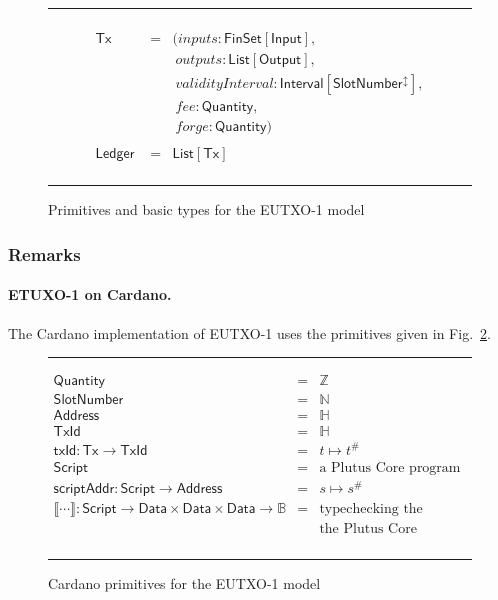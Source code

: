 \documentclass[a4paper]{article}
\renewcommand{\i}{\textit}  %
\newcommand{\s}{\textsf}  %
\newcommand{\msf}[1]{\ensuremath{\mathsf{#1}}}
\newcommand{\mi}[1]{\ensuremath{\mathit{#1}}}
\newcommand\rfskip{7pt}
\newenvironment{ruledfigure}[1]{\begin{figure}[#1]\hrule\vspace{\rfskip}}{\vspace{\rfskip}\hrule\end{figure}}
\newcommand{\hash}[1]{\ensuremath{#1^{\#}}}
\newcommand{\List}[1]{\ensuremath{\s{List}[#1]}}
\newcommand{\FinSet}[1]{\ensuremath{\s{FinSet}[#1]}}
\newcommand{\Interval}[1]{\ensuremath{\s{Interval}[#1]}}
\newcommand{\extended}[1]{#1^\updownarrow}
\newcommand{\script}{\ensuremath{\s{Script}}}
\newcommand{\scriptAddr}{\msf{scriptAddr}}
\newcommand{\TxId}{\ensuremath{\s{TxId}}}
\newcommand{\txId}{\msf{txId}}
\newcommand{\Address}{\ensuremath{\s{Address}}}
\newcommand{\inputs}{\mi{inputs}}
\newcommand{\outputs}{\mi{outputs}}
\newcommand{\forge}{\mi{forge}}
\newcommand{\fee}{\mi{fee}}
\newcommand{\Data}{\ensuremath{\s{Data}}}
\newcommand{\slotnum}{\ensuremath{\s{SlotNumber}}}
\newcommand{\eutxotx}{\msf{Tx}}
\newcommand{\qty}{\ensuremath{\s{Quantity}}}
\newcommand\B{\ensuremath{\mathbb{B}}}
\newcommand\N{\ensuremath{\mathbb{N}}}
\newcommand\Z{\ensuremath{\mathbb{Z}}}
\renewcommand\H{\ensuremath{\mathbb{H}}}
\begin{document}
\begin{ruledfigure}{H}
\begin{displaymath}
\begin{array}{rll}
     \\
     \eutxotx\s{ } &=&(\inputs: \FinSet{\s{Input}},\\
                   & &\ \outputs: \List{\s{Output}},\\
                   & &\ \i{validityInterval}: \Interval{\extended{\slotnum}},\\
                   & &\ \fee: \qty,\\
                   & &\ \forge: \qty) \\
     \\
     \s{Ledger } &=&\!\List{\eutxotx}\\
  \end{array}
  \end{displaymath}
  \caption{Primitives and basic types for the EUTXO-1 model}
  \label{fig:eutxo-1-types}
\end{ruledfigure}

\subsubsection{Remarks}
\paragraph{ETUXO-1 on Cardano.}
The Cardano implementation of EUTXO-1 uses the primitives given in
Fig.~\ref{fig:eutxo-1-types-cardano}.

\begin{ruledfigure}{H}
  \begin{displaymath}
  \begin{array}{rll}
    \qty{} &=& \Z\\
    \slotnum &=& \N\\
    \Address &=& \H\\
    \TxId &=& \H\\
    \txId : \eutxotx \rightarrow \TxId &=& t \mapsto \hash{t}\\
    \script &=& \mbox{a Plutus Core program}\\
    \scriptAddr : \script \rightarrow \Address &=& s \mapsto \hash{s}\\
    \llbracket \cdots \rrbracket : \script \rightarrow \Data \times \Data \times
    \Data \rightarrow \B &=& \mbox{typechecking the program and running}\\
                             &&\mbox{the Plutus Core interpreter}\\
  \end{array}
  \end{displaymath}
  \caption{Cardano primitives for the EUTXO-1 model}
  \label{fig:eutxo-1-types-cardano}
\end{ruledfigure}
\end{document}
